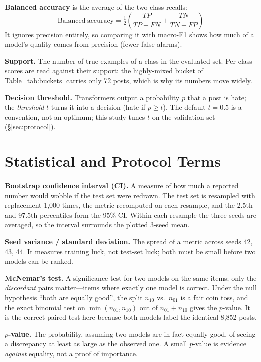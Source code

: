 \textbf{Balanced accuracy} is the average of the two class recalls:
\begin{equation}
\mathrm{Balanced\ accuracy} = \tfrac{1}{2}\left(\frac{TP}{TP+FN} + \frac{TN}{TN+FP}\right)
\end{equation}
It ignores precision entirely, so comparing it with macro-F1 shows how much of a
model's quality comes from precision (fewer false alarms).

\textbf{Support.} The number of true examples of a class in the evaluated set.
Per-class scores are read against their support: the highly-mixed bucket of
Table~\ref{tab:buckets} carries only 72 posts, which is why its numbers move
widely.

\textbf{Decision threshold.} Transformers output a probability $p$ that a post is
hate; the \emph{threshold} $t$ turns it into a decision (hate if $p \geq t$).
The default $t = 0.5$ is a convention, not an optimum; this study tunes $t$ on
the validation set (\S\ref{sec:protocol}).

\clearpage
\section{Statistical and Protocol Terms}
\label{app:stats}

\textbf{Bootstrap confidence interval (CI).} A measure of how much a reported
number would wobble if the test set were redrawn. The test set is resampled with
replacement 1{,}000 times, the metric recomputed on each resample, and the 2.5th
and 97.5th percentiles form the 95\% CI. Within each resample the three seeds are
averaged, so the interval surrounds the plotted 3-seed mean.

\textbf{Seed variance / standard deviation.} The spread of a metric across seeds
42, 43, 44. It measures training luck, not test-set luck; both must be small
before two models can be ranked.

\textbf{McNemar's test.} A significance test for two models on the same items;
only the \emph{discordant} pairs matter---items where exactly one model is
correct. Under the null hypothesis ``both are equally good'', the split
$n_{10}$ vs.\ $n_{01}$ is a fair coin toss, and the exact binomial test on
$\min(n_{01}, n_{10})$ out of $n_{01}+n_{10}$ gives the $p$-value. It is the
correct paired test here because both models label the identical 8{,}852 posts.

\textbf{$p$-value.} The probability, assuming two models are in fact equally
good, of seeing a discrepancy at least as large as the observed one. A small
$p$-value is evidence \emph{against} equality, not a proof of importance.

